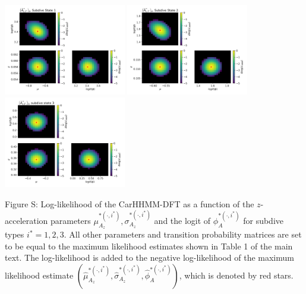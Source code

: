 \documentclass{article}
\begin{document}
        \begin{center}
        \includegraphics[width=2.1in]{../Plots/2019/20190902-182840-CATs_OB_1_0_267_CarHHMM2_fine-theta-likelihood-Az-0.png}
        \includegraphics[width=2.1in]{../Plots/2019/20190902-182840-CATs_OB_1_0_267_CarHHMM2_fine-theta-likelihood-Az-1.png}
        \includegraphics[width=2.1in]{../Plots/2019/20190902-182840-CATs_OB_1_0_267_CarHHMM2_fine-theta-likelihood-Az-2.png}
        \end{center}
        
        \noindent Figure S: Log-likelihood of the CarHHMM-DFT as a function of the $z$-acceleration parameters $\mu_{A_z}^{*(\cdot,i^*)}, \sigma_{A_z}^{*(\cdot,i^*)}$ and the logit of $\phi_{A}^{*(\cdot,i^*)}$ for subdive types $i^* = 1,2,3$. All other parameters and transition probability matrices are set to be equal to the maximum likelihood estimates shown in Table 1 of the main text. The log-likelihood is added to the negative log-likelihood of the maximum likelihood estimate $(\hat \mu_{A_z}^{*(\cdot,i^*)}, \hat \sigma_{A_z}^{*(\cdot,i^*)}, \hat \phi_{A}^{*(\cdot,i^*)})$, which is denoted by red stars.
        \addtocounter{fignum}{1}
        
        \newpage
        
\end{document}
